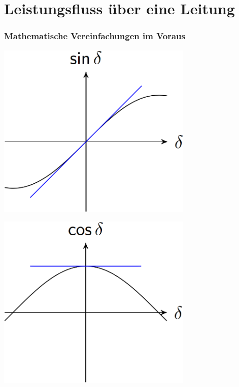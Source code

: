 \section{Leistungsfluss über eine Leitung}

\subsubsection{Mathematische Vereinfachungen im Voraus}

\begin{minipage}[c]{0.48\columnwidth}
        \includegraphics[width=0.7\textwidth, align=c]{images/Erkenntnisse_1.png}
\end{minipage}
\hfill
\begin{minipage}[c]{0.48\columnwidth}
        \includegraphics[width=0.7\textwidth, align=c]{images/Erkenntnisse_2.png}
\end{minipage}

\vspace{0.15cm}


